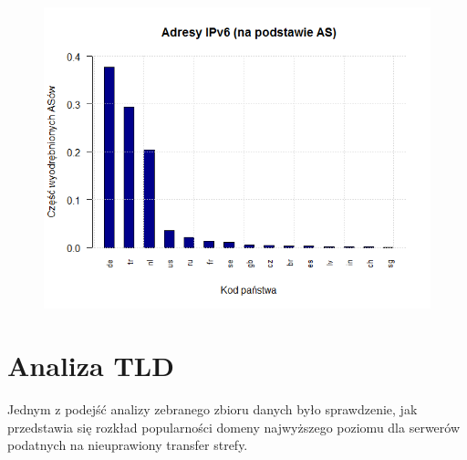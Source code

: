 \begin{figure}[ht]
	\centering
	\includegraphics[width=1.0\textwidth]{image/ipv6_countries}
	\caption{}
	\label{fig:ipv6_countries}
\end{figure}

\section{Analiza TLD}
Jednym z podejść analizy zebranego zbioru danych było sprawdzenie, jak przedstawia się rozkład popularności domeny najwyższego poziomu dla serwerów podatnych na nieuprawiony transfer strefy. 

